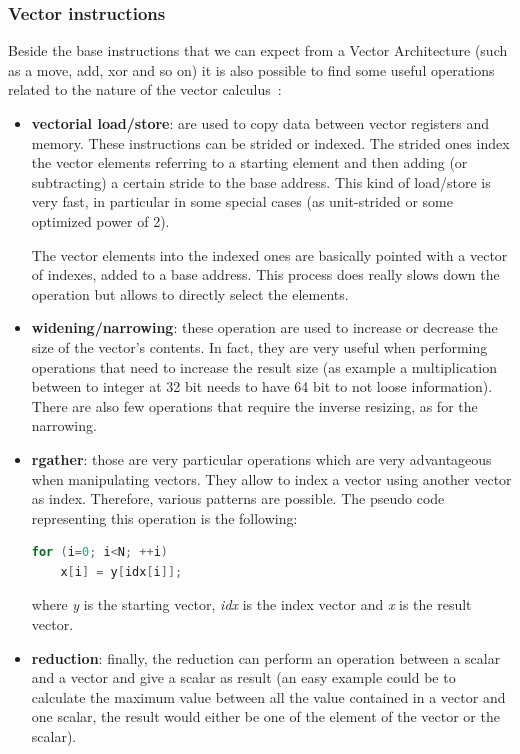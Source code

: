 \subsubsection{Vector instructions}
Beside the base instructions that we can expect from a Vector Architecture (such as a move, add, xor and so on) it is also possible to find some useful operations related to the nature of the vector calculus~\cite{riscv-v-specs}:
\begin{itemize}
    \item \textbf{vectorial load/store}: are used to copy data between vector registers and memory. These instructions can be strided or indexed. The strided ones index the vector elements referring to a starting element and then adding (or subtracting) a certain stride to the base address. This kind of load/store is very fast, in particular in some special cases (as unit-strided or some optimized power of 2).
    
    The vector elements into the indexed ones are basically pointed with a vector of indexes, added to a base address. This process does really slows down the operation but allows to directly select the elements.
    
    \item \textbf{widening/narrowing}: these operation are used to increase or decrease the size of the vector's contents. In fact, they are very useful when performing operations that need to increase the result size (as example a multiplication between to integer at 32 bit needs to have 64 bit to not loose information). There are also few operations that require the inverse resizing, as for the narrowing.
    
    \item \textbf{rgather}: those are very particular operations which are very advantageous when manipulating vectors. They allow to index a vector using another vector as index. Therefore, various patterns are possible. The pseudo code representing this operation is the following: 
    \begin{lstlisting}[language=Verilog,style=verilog-style, numbers=none]
  for (i=0; i<N; ++i)
    x[i] = y[idx[i]];
    \end{lstlisting}
    where \emph{y} is the starting vector, \emph{idx} is the index vector and \emph{x} is the result vector.
    
    \item \textbf{reduction}: finally, the reduction can perform an operation between a scalar and a vector and give a scalar as result (an easy example could be to calculate the maximum value between all the value contained in a vector and one scalar, the result would either be one of the element of the vector or the scalar).
    
\end{itemize}


